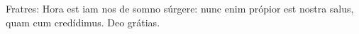 Fratres: Hora est iam nos de somno súrgere: nunc enim própior est nostra salus, quam cum credídimus.
\rubric{\Rbar} Deo grátias.
